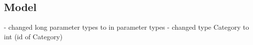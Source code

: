 \subsection{Model}

- changed long parameter types to in parameter types
- changed type Category to int (id of Category)